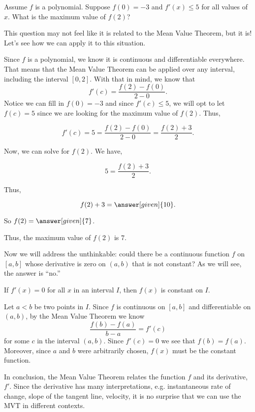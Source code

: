 \documentclass{ximera}
\begin{document}
\begin{example}
   Assume $f$ is a polynomial. Suppose $f(0)=-3$ and $f'(x)\leq 5$ for all values of $x$. What is the maximum value of $f(2)$?
    \begin{explanation}
        This question may not feel like it is related to the Mean Value Theorem, but it is! Let's see how we can apply it to this situation. 
        
        Since $f$ is a polynomial, we know it is continuous and differentiable everywhere. That means that the Mean Value Theorem can be applied over any interval, including the interval $[0,2]$. With that in mind, we know that 
        \[ f'(c)=\frac{f(2)-f(0)}{2-0}.\]
Notice we can fill in $f(0)=-3$ and since $f'(c)\leq 5$, we will opt to let $f(c)=5$ since we are looking for the maximum value of $f(2)$. Thus,

\[ f'(c)=5=\frac{f(2)-f(0)}{2-0}=\frac{f(2)+3}{2}.\]

Now, we can solve for $f(2)$. We have,

\[5=\frac{f(2)+3}{2}.\]

Thus,

\[f(2)+3=\answer[given]{10}.\]

So $f(2)=\answer[given]{7}$.

Thus, the maximum value of $f(2)$ is $7$.

    \end{explanation}
\end{example}
Now we will address the unthinkable: could there be a continuous
function $f$ on $[a,b]$ whose derivative is zero on $(a,b)$ that is
not constant? As we will see, the answer is ``no.''

\begin{theorem} 
If $f'(x)=0$ for all $x$ in an interval $I$, then $f(x)$ is constant
on $I$.
\begin{explanation}
Let $a< b$ be two points in $I$. Since $f$ is continuous on $[a,b]$
and differentiable on $(a,b)$, by the Mean Value Theorem we know
\[
\frac{f(b)-f(a)}{b-a} = f'(c)
\]
for some $c$ in the interval $(a,b)$. Since $f'(c)=0$ we see that
$f(b)=f(a)$. %
Moreover, since $a$ and $b$ were arbitrarily chosen,
$f(x)$ must be the constant function.
\end{explanation}
\end{theorem}



In conclusion, the Mean Value Theorem relates the function $f$ and its derivative, $f'$. Since the derivative has many interpretations, e.g. instantaneous rate of change, slope of the tangent line, velocity, it is no surprise that we can use the MVT in different contexts.
\end{document}
